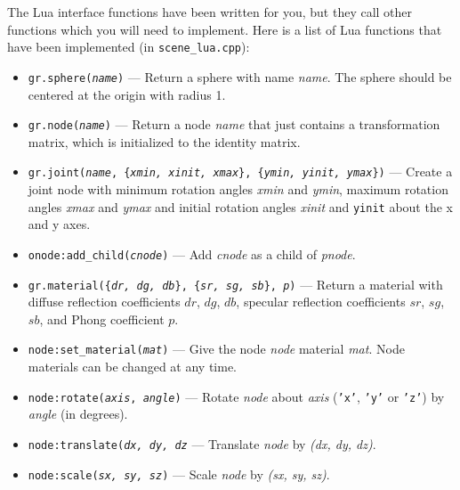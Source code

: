 The Lua interface functions have been written for you, but they call
other functions which you will need to implement. Here is a list of
Lua functions that have been implemented (in \texttt{scene\_lua.cpp}):

\begin{itemize}
\item \texttt{gr.sphere(\textit{name})} ---
  Return a sphere with name \textit{name}.
  The sphere should be centered at the origin with
  radius 1.

\item \texttt{gr.node(\textit{name})} --- 
  Return a node \textit{name} that
  just contains a transformation matrix, which is 
  initialized to the identity matrix. 

\item \texttt{gr.joint(\textit{name}, \{\textit{xmin, xinit, xmax}\}, \{\textit{ymin, yinit, ymax}\})} --- 
  Create a joint node with minimum rotation angles \textit{xmin} and
  \textit{ymin}, maximum rotation angles \textit{xmax} and \textit{ymax} and
  initial rotation angles \textit{xinit} and \texttt{yinit} about the
  x and y axes.

\item \texttt{onode:add\_child(\textit{cnode})} --- 
  Add \textit{cnode} as a child of \textit{pnode}.

\item \texttt{gr.material(\{\textit{dr, dg, db}\}, \{\textit{sr, sg, sb}\}, \textit{p})} ---
  Return a material with diffuse reflection
  coefficients $dr$, $dg$, $db$, specular reflection
  coefficients $sr$, $sg$, $sb$, and Phong coefficient $p$.

\item \texttt{node:set\_material(\textit{mat})} --- 
  Give the node \textit{node} material \textit{mat}.  
  Node materials can be changed at any time.

\item \texttt{node:rotate(\textit{axis}, \textit{angle})} ---
  Rotate \textit{node} about \textit{axis} (\texttt{'x'}, \texttt{'y'}
  or \texttt{'z'}) by \textit{angle} (in degrees).
  
\item \texttt{node:translate(\textit{dx, dy, dz}} ---
  Translate \textit{node} by \textit{(dx, dy, dz)}.
  
\item \texttt{node:scale(\textit{sx, sy, sz})} ---
  Scale \textit{node} by \textit{(sx, sy, sz)}.
\end{itemize}

